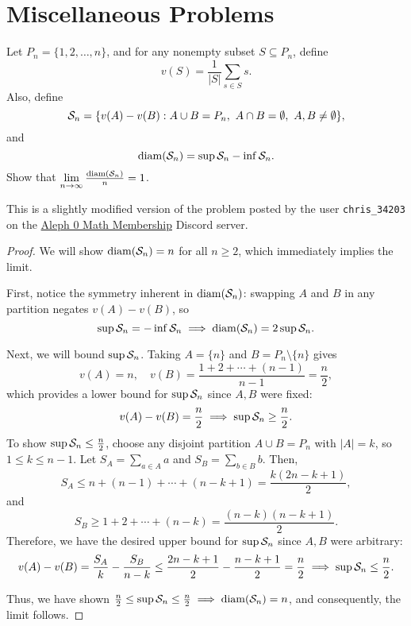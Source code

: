 \section{Miscellaneous Problems}

\begin{problem}
  Let $P_{n} = \{ 1, 2, \dots, n \}$, and for any nonempty subset $S \subseteq P_{n}$, define
  \[
    v(S) = \dfrac{1}{|S|} \sum_{s \in S} s. 
  \]
  Also, define 
  \[
    \mathcal{S}_{n} = \{ v(A) - v(B) : A \cup B = P_n,\ A \cap B = \emptyset,\ A, B \neq \emptyset \},
  \]
  and 
  \[
    \operatorname{diam}(\mathcal{S}_{n}) = \sup \mathcal{S}_{n} - \inf \mathcal{S}_{n}.
  \]
  Show that $\lim\limits_{n \to \infty} \frac{\operatorname{diam}(\mathcal{S}_{n})}{n} = 1$.

  \begin{callout}
    This is a slightly modified version of the problem posted by the user \texttt{chris\_34203}
    on the \href{https://discord.com/channels/1381996954237800608/1381996954673745932/1393174128432906357}{Aleph 0 Math Membership} Discord server.
  \end{callout}

\end{problem}

\begin{proof}
  We will show $\operatorname{diam}(\mathcal{S}_{n}) = n$ for all $n \ge 2$, which immediately implies the limit.

  First, notice the symmetry inherent in $\operatorname{diam}(\mathcal{S}_{n})$: swapping $A$ and $B$ in any partition negates $v(A)-v(B)$, so
  \[
    \sup \mathcal{S}_{n} = -\inf \mathcal{S}_{n} \implies \operatorname{diam}(\mathcal{S}_{n}) = 2\sup \mathcal{S}_{n}.
  \]

  Next, we will bound $\sup \mathcal{S}_{n}$. Taking $A = \{ n \}$ and $B = P_n \setminus \{ n \}$ gives
  \[
    v(A) = n, \quad v(B) = \frac{1 + 2 + \cdots + (n-1)}{n - 1} = \frac{n}{2},
  \]
  which provides a lower bound for $\sup \mathcal{S}_{n}$ since $A, B$ were fixed:
  \[
    v(A) - v(B) = \frac{n}{2} \implies \sup \mathcal{S}_{n} \ge \frac{n}{2}.
  \]
  To show $\sup \mathcal{S}_{n} \le \frac{n}{2}$, choose any disjoint partition $A \cup B = P_{n}$ with $|A| = k$, so $1 \le k \le n - 1$.
  Let $S_A = \sum\limits_{a \in A} a$ and $S_B = \sum\limits_{b \in B} b$. Then,
  \[
    S_{A} \le n + (n-1) + \cdots + (n - k + 1) = \frac{k(2n - k + 1)}{2},
  \]
  and
  \[
    S_{B} \ge 1 + 2 + \cdots + (n - k) = \frac{(n - k)(n - k + 1)}{2}.
  \]
  Therefore, we have the desired upper bound for $\sup \mathcal{S}_{n}$ since $A, B$ were arbitrary:
  \[
    v(A) - v(B) = \frac{S_A}{k} - \frac{S_B}{n - k} \le \frac{2n - k + 1}{2} - \frac{n - k + 1}{2} = \frac{n}{2} \implies \sup \mathcal{S}_{n} \le \frac{n}{2}.
  \]

  Thus, we have shown $\frac{n}{2} \leq \sup \mathcal{S}_{n} \leq \frac{n}{2} \implies \operatorname{diam}(\mathcal{S}_{n}) = n$, and consequently,
  the limit follows.
\end{proof}

